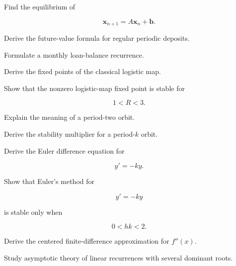 \begin{exercise}[3]
Find the equilibrium of

\[
\mathbf{x}_{n+1}
=
A\mathbf{x}_n+\mathbf{b}.
\]
\end{exercise}

\begin{exercise}[3]
Derive the future-value formula for regular periodic deposits.
\end{exercise}

\begin{exercise}[3]
Formulate a monthly loan-balance recurrence.
\end{exercise}

\begin{exercise}[3]
Derive the fixed points of the classical logistic map.
\end{exercise}

\begin{exercise}[3]
Show that the nonzero logistic-map fixed point is stable for

\[
1<R<3.
\]
\end{exercise}

\begin{exercise}[3]
Explain the meaning of a period-two orbit.
\end{exercise}

\begin{exercise}[3]
Derive the stability multiplier for a period-\(k\) orbit.
\end{exercise}

\begin{exercise}[3]
Derive the Euler difference equation for

\[
y'=-ky.
\]
\end{exercise}

\begin{exercise}[3]
Show that Euler's method for

\[
y'=-ky
\]

is stable only when

\[
0<hk<2.
\]
\end{exercise}

\begin{exercise}[3]
Derive the centered finite-difference approximation for \(f''(x)\).
\end{exercise}

\begin{exercise}[4]
Study asymptotic theory of linear recurrences with several dominant
roots.
\end{exercise}

